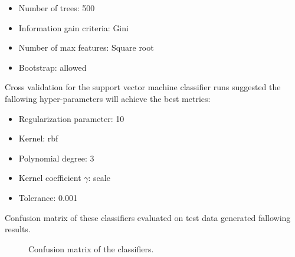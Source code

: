 \begin{itemize}
    \item Number of trees: 500
    \item Information gain criteria: Gini
    \item Number of max features: Square root
    \item Bootstrap: allowed
\end{itemize}

Cross validation for the support vector machine classifier runs suggested the fallowing hyper-parameters will achieve the best metrics:

\begin{itemize}
    \item Regularization parameter: 10
    \item Kernel: rbf
    \item Polynomial degree: 3
    \item Kernel coefficient $\gamma$: scale
    \item Tolerance: 0.001
\end{itemize}

Confusion matrix of these classifiers evaluated on test data generated fallowing results.

\begin{figure}[H]%
    \centering
    \qquad
    \caption{Confusion matrix of the classifiers.}%
    \label{fig:cmatrix}%
\end{figure}

